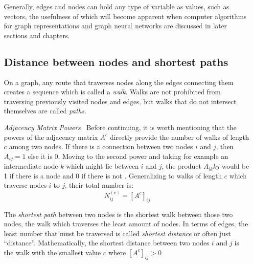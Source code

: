 Generally, edges and nodes can hold any type of variable as values,
such as vectors, the usefulness of which will become apparent when
computer algorithms for graph representations and graph neural
networks are discussed in later sections and chapters.


\subsection{Distance between nodes and shortest paths}

On a graph, any route that traverses nodes along the edges connecting them
creates a sequence which is called a \textit{walk}. Walks are not prohibited
from traversing previously visited nodes and edges, but walks that do not intersect
themselves are called \textit{paths}.

\begin{remark}
  \textit{Adjacency Matrix Powers}  ~Before continuing, it is worth
  mentioning that the powers of the adjacency matrix $A^c$ directly provide
  the number of walks of length $c$ among two nodes. If there is a connection
  between two nodes $i$ and $j$, then $A_{ij} = 1$ else it is 0. Moving
  to the second power and taking for example an intermediate node $k$
  which might lie between $i$ and $j$, the product $A_{ik}{kj}$ would be
  1 if there is a node and 0 if there is not \cite[p.~131]{book:Newman}.
  Generalizing to walks of length $c$ which traverse nodes $i$ to $j$, their
total number is:
  \begin{equation*}
    N^{(c)}_{ij} = [A^c]_{ij}
  \end{equation*}
\end{remark}

The \textit{shortest path} between two nodes is the shortest walk
between those two nodes, the walk which traverses the least amount of
nodes. In terms of edges, the least number that must be traversed
is called \textit{shortest distance}
or often just ``distance''. Mathematically, the shortest distance
between two nodes $i$ and $j$ is the walk with the smallest value $c$ where
$[A^c]_{ij} > 0$

